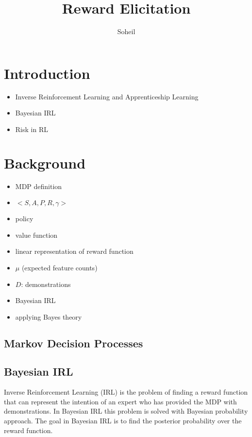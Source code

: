 \documentclass{article}
\title{Reward Elicitation}
\author{Soheil}
\date{}
\theoremstyle{remark}
\theoremstyle{remark}
\theoremstyle{remark}
\theoremstyle{remark}
\theoremstyle{remark}
\theoremstyle{remark}
\begin{document}
\maketitle
\section*{Introduction}

\begin{itemize}
  \item Inverse Reinforcement Learning and Apprenticeship Learning
  \item Bayesian IRL
  \item Risk in RL
\end{itemize}



\section*{Background}

\begin{itemize}
  \item MDP definition
  \item $<S, A, P, R, \gamma>$
  \item policy
  \item value function
  \item linear representation of reward function
  \item $\mu$ (expected feature counts)

  \item $D$: demonstrations
  \item Bayesian IRL
  \item applying Bayes theory

\end{itemize}

\subsection*{Markov Decision Processes}

\subsection*{Bayesian IRL}
Inverse Reinforcement Learning (IRL) is the problem of finding a reward function that can represent the intention of an expert who has provided the MDP with demonstrations. In Bayesian IRL this problem is solved with Bayesian probability approach. The goal in Bayesian IRL is to find the posterior probability over the reward function\cite{DeepakRamachandran2007}.
\end{document}
